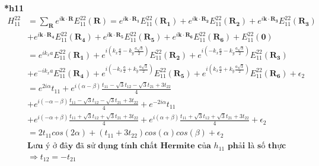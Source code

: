 \documentclass{report}
\begin{document}
\noindent\textbf{*h11}
\begin{align*}
	H^{22}_{11} & = \sum_{\mathbf{R}} e^{i \mathbf{k} \cdot \mathbf{R}} E^{22}_{11}(\mathbf{R})
	= e^{i \mathbf{k} \cdot \mathbf{R_1}} E^{22}_{11}(\mathbf{R_1})
	+ e^{i \mathbf{k} \cdot \mathbf{R_2}} E^{22}_{11}(\mathbf{R_2})
	+ e^{i \mathbf{k} \cdot \mathbf{R_3}} E^{22}_{11}(\mathbf{R_3})                                                                                                                                                                 \\
	            & + e^{i \mathbf{k} \cdot \mathbf{R_4}} E^{22}_{11}(\mathbf{R_4})
	+ e^{i \mathbf{k} \cdot \mathbf{R_5}} E^{22}_{11}(\mathbf{R_5})
	+ e^{i \mathbf{k} \cdot \mathbf{R_6}} E^{22}_{11}(\mathbf{R_6})
	+ E^{22}_{11}(\mathbf{0})                                                                                                                                                                                                       \\
	            & = e^{i k_x a} E^{22}_{11}(\mathbf{R_1})
	+ e^{i \left( k_x \frac{a}{2} - k_y \frac{a\sqrt{3}}{2} \right)} E^{22}_{11}(\mathbf{R_2})
	+ e^{i \left( -k_x \frac{a}{2} - k_y \frac{a\sqrt{3}}{2} \right)} E^{22}_{11}(\mathbf{R_3})                                                                                                                                     \\
	            & + e^{-i k_x a } E^{22}_{11}(\mathbf{R_4})
	+ e^{i \left( -k_x \frac{a}{2} + k_y \frac{a\sqrt{3}}{2} \right)} E^{22}_{11}(\mathbf{R_5})
	+ e^{i \left( k_x \frac{a}{2} + k_y \frac{a\sqrt{3}}{2} \right)} E^{22}_{11}(\mathbf{R_6}) + \epsilon_2                                                                                                                         \\
	            & = e^{2i\alpha} t_{11} + e^{i \left( \alpha - \beta \right)} \frac{t_{11} -\sqrt{3}t_{12} - \sqrt{3}t_{21} + 3t_{22}}{4}                                                                                           \\
	            & + e^{i \left( -\alpha - \beta \right)} \frac{t_{11} -\sqrt{3}t_{12} - \sqrt{3}t_{21} + 3t_{22}}{4} + e^{-2i\alpha} t_{11}                                                                                         \\
	            & + e^{i \left( -\alpha + \beta \right)} \frac{t_{11} +\sqrt{3}t_{12} + \sqrt{3}t_{21} + 3t_{22}}{4} + e^{i \left( \alpha + \beta \right)} \frac{t_{11} +\sqrt{3}t_{12} + \sqrt{3}t_{21} + 3t_{22}}{4} + \epsilon_2 \\
	            & = 2t_{11}cos(2\alpha) + \left (t_{11} + 3t_{22}\right )cos(\alpha)cos(\beta) + \epsilon_2                                                                                                                         \\
	            & \textbf{Lưu ý ở đây đã sử dụng tính chất Hermite của $h_{11}$ phải là số thực}                                                                                                                                    \\ &\Rightarrow t_{12} = - t_{21}
\end{align*}
\end{document}
